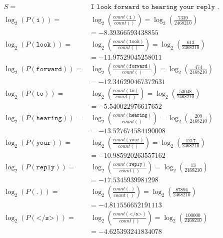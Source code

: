 \documentclass{article}
\begin{document}
\begin{equation}\begin{split}
S =&\ \texttt{I look forward to hearing your reply .} \\
\log_{2} (P(\texttt{i})) =&\  \log_{2} (\frac{count(\texttt{i})}{count()}) = \log_{2} (\frac{7339}{2468210}) \\ & = -8.39366593438855  \\
\log_{2} (P(\texttt{look})) =&\  \log_{2} (\frac{count(\texttt{look})}{count()}) = \log_{2} (\frac{613}{2468210}) \\ & = -11.97529045258011  \\
\log_{2} (P(\texttt{forward})) =&\  \log_{2} (\frac{count(\texttt{forward})}{count()}) = \log_{2} (\frac{474}{2468210}) \\ & = -12.346290467372631  \\
\log_{2} (P(\texttt{to})) =&\  \log_{2} (\frac{count(\texttt{to})}{count()}) = \log_{2} (\frac{53048}{2468210}) \\ & = -5.540022976617652  \\
\log_{2} (P(\texttt{hearing})) =&\  \log_{2} (\frac{count(\texttt{hearing})}{count()}) = \log_{2} (\frac{209}{2468210}) \\ &= -13.527674584190008  \\
\log_{2} (P(\texttt{your})) =&\  \log_{2} (\frac{count(\texttt{your})}{count()}) = \log_{2} (\frac{1217}{2468210}) \\ & = -10.985920263557162  \\
\log_{2} (P(\texttt{reply})) =&\  \log_{2} (\frac{count(\texttt{reply})}{count()}) = \log_{2} (\frac{13}{2468210}) \\ & = -17.5345939981298  \\
\log_{2} (P(\texttt{.})) =&\  \log_{2} (\frac{count(\texttt{.})}{count()}) = \log_{2} (\frac{87894}{2468210}) \\ & = -4.811556652191113  \\
\log_{2} (P(\texttt{</s>})) =&\  \log_{2} (\frac{count(\texttt{</s>})}{count()}) = \log_{2} (\frac{100000}{2468210}) \\ & = -4.625393241834078  \\

\end{split}
\end{equation}
\end{document}
